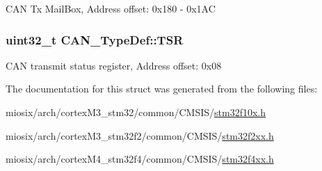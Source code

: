 C\-A\-N Tx Mail\-Box, Address offset\-: 0x180 -\/ 0x1\-A\-C \hypertarget{struct_c_a_n___type_def_acbc82ac4e87e75350fc586be5e56d95b}{
\subsubsection[{T\-S\-R}]{ uint32\-\_\-t C\-A\-N\-\_\-\-Type\-Def\-::\-T\-S\-R}}\label{struct_c_a_n___type_def_acbc82ac4e87e75350fc586be5e56d95b}
C\-A\-N transmit status register, Address offset\-: 0x08 

The documentation for this struct was generated from the following files\-:\begin{DoxyCompactItemize}
\item 
miosix/arch/cortex\-M3\-\_\-stm32/common/\-C\-M\-S\-I\-S/\hyperlink{stm32f10x_8h}{stm32f10x.\-h}\item 
miosix/arch/cortex\-M3\-\_\-stm32f2/common/\-C\-M\-S\-I\-S/\hyperlink{stm32f2xx_8h}{stm32f2xx.\-h}\item 
miosix/arch/cortex\-M4\-\_\-stm32f4/common/\-C\-M\-S\-I\-S/\hyperlink{stm32f4xx_8h}{stm32f4xx.\-h}\end{DoxyCompactItemize}
